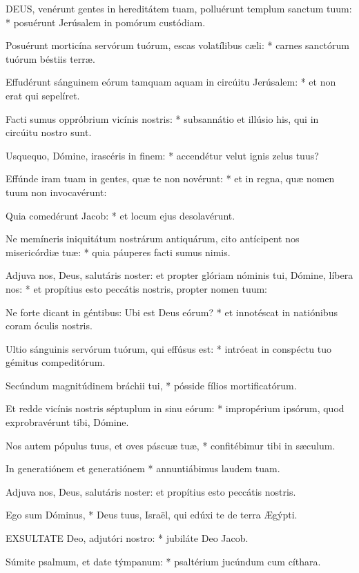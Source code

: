 
\lettrine[lines=2]{D}{EUS}, venérunt gentes in hereditátem tuam, polluérunt templum sanctum tuum: * posuérunt Jerúsalem in pomórum custódiam.

Posuérunt morticína servórum tuórum, escas volatílibus cæli: * carnes sanctórum tuórum béstiis terræ.

Effudérunt sánguinem eórum tamquam aquam in circúitu Jerúsalem: * et non erat qui sepelíret.

Facti sumus oppróbrium vicínis nostris: * subsannátio et illúsio his, qui in circúitu nostro sunt.

Usquequo, Dómine, irascéris in finem: * accendétur velut ignis zelus tuus?

Effúnde iram tuam in gentes, quæ te non novérunt: * et in regna, quæ nomen tuum non invocavérunt:

Quia comedérunt Jacob: * et locum ejus desolavérunt.

Ne memíneris iniquitátum nostrárum antiquárum, cito antícipent nos misericórdiæ tuæ: * quia páuperes facti sumus nimis.

Adjuva nos, Deus, salutáris noster: et propter glóriam nóminis tui, Dómine, líbera nos: * et propítius esto peccátis nostris, propter nomen tuum:

Ne forte dicant in géntibus: Ubi est Deus eórum? * et innotéscat in natiónibus coram óculis nostris.

Ultio sánguinis servórum tuórum, qui effúsus est: * intróeat in conspéctu tuo gémitus compeditórum.

Secúndum magnitúdinem bráchii tui, * pósside fílios mortificatórum.

Et redde vicínis nostris séptuplum in sinu eórum: * impropérium ipsórum, quod exprobravérunt tibi, Dómine.

Nos autem pópulus tuus, et oves páscuæ tuæ, * confitébimur tibi in sæculum.

In generatiónem et generatiónem * annuntiábimus laudem tuam.

 Adjuva nos, Deus, salutáris noster: et propítius esto peccátis nostris.

 Ego sum Dóminus, * Deus tuus, Israël, qui edúxi te de terra Ægýpti.


\lettrine[lines=2]{E}{XSULTATE} Deo, adjutóri nostro: * jubiláte Deo Jacob.

Súmite psalmum, et date týmpanum: * psaltérium jucúndum cum cíthara.

